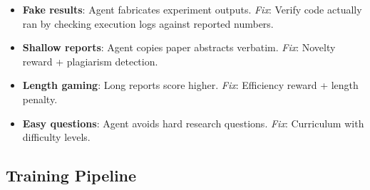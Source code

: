 \begin{warningbox}
\begin{itemize}
  \item \textbf{Fake results}: Agent fabricates experiment outputs. \emph{Fix}: Verify code actually ran by checking execution logs against reported numbers.
  \item \textbf{Shallow reports}: Agent copies paper abstracts verbatim. \emph{Fix}: Novelty reward + plagiarism detection.
  \item \textbf{Length gaming}: Long reports score higher. \emph{Fix}: Efficiency reward + length penalty.
  \item \textbf{Easy questions}: Agent avoids hard research questions. \emph{Fix}: Curriculum with difficulty levels.
\end{itemize}
\end{warningbox}

\subsection{Training Pipeline}
\label{training-pipeline}

